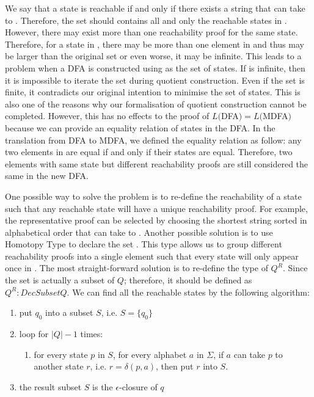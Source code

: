 \par We say that a state  is reachable if and
only if there exists a string  that can take  to
. Therefore, the set  should contains all and only the
reachable states in . However, there may exist more than one
reachability proof for the same state. Therefore, for a state in , there may be
more than one element in  and thus 
may be larger than the original set  or even worse, it may be
infinite. This leads to a problem when a DFA is constructed using
 as the set of states. If  is
infinite, then it is impossible to iterate the set during 
quotient construction. Even if the set  is finite, it
contradicts our original intention to minimise the set of states. This is also one of the
reasons why our formalisation of quotient construction cannot be
completed. However, this has no effects to the proof of \(L(\)DFA\() =
  L(\)MDFA\()\) because we can provide an equality relation of states in
the DFA. In the translation from DFA to MDFA, we defined
the equality relation as follow: any two elements in  are equal if and only
if their states are equal. Therefore, two elements with same state
but different reachability proofs are still considered the same in the new DFA. 

\par One possible way to solve the problem is to re-define the
reachability of a state such that any reachable state will have a
unique reachability proof. For example, the representative proof can
be selected by choosing the shortest string  sorted in
alphabetical order that can take  to . Another possible solution is to use
Homotopy Type to declare the set . This type allows us to
group different reachability proofs into a single element such that
every state will only appear once in . The most
straight-forward solution is to re-define the type of \(Q^R\). Since the set is
actually a subset of \(Q\); therefore, it should be defined as \(Q^R :
DecSubset Q\). We can find all the reachable states by the following algorithm:
\begin{enumerate}[nolistsep]
  \item put \(q_0\) into a subset \(S\), i.e. \(S = \{q_0\}\)
  \item loop for \(|Q| - 1\) times: 
  \begin{enumerate}
    \item for every state \(p\) in \(S\), for every alphabet \(a\) in
      \(\Sigma\), if \(a\) can take
      \(p\) to another state \(r\), i.e. \(r = \delta (p,a)\), then put \(r\) into \(S\). 
  \end{enumerate}
  \item the result subset \(S\) is the \(\epsilon\)-closure of \(q\)
\end{enumerate}

